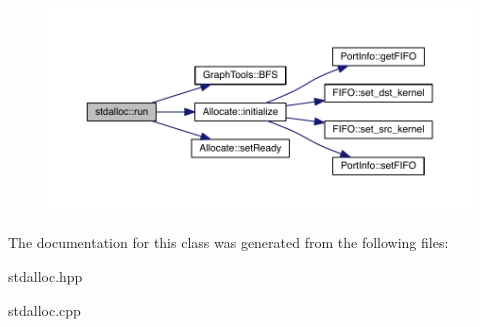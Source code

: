 \begin{figure}[H]
\begin{center}
\leavevmode
\includegraphics[width=350pt]{classstdalloc_a60438b15948ce354b52b03ba6d975de0_cgraph}
\end{center}
\end{figure}


The documentation for this class was generated from the following files\+:\begin{DoxyCompactItemize}
\item 
stdalloc.\+hpp\item 
stdalloc.\+cpp\end{DoxyCompactItemize}
